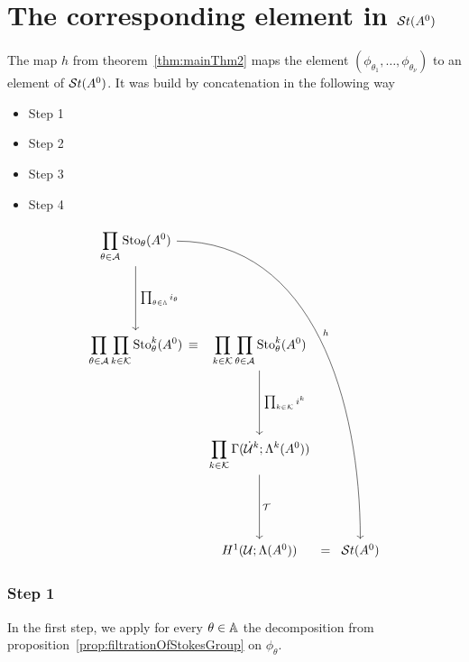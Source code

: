 \section{The corresponding element in $\mathcal{S}{}t(A^0)$}
The map $h$ from theorem~\ref{thm:mainThm2} maps the element
$(\phi_{\theta_1},\dots,\phi_{\theta_\nu})$ to an element of $\mathcal{S}{}t(A^0)$.
It was build by concatenation in the following way
\bgroup
{}
\begin{paracol}{2}\sloppy
\switchcolumn[0]\noindent
  \vspace*{40mm}
  \begin{itemize}
    \item[] Step 1 
    \item[] \qquad Step 2 
    \item[] \qquad \qquad Step 3 
    \item[] \qquad \qquad \qquad Step 4 
  \end{itemize}
\switchcolumn[1]\noindent
  \[ \begin{tikzcd}[column sep=0,row sep=1.8cm]
      \displaystyle \prod_{\theta\in\cA}\Sto_\theta(A^0)
      \dar{\tikzmark{e1}\prod_{\theta\in\A}i_\theta}
      \arrow[dddrrrr, out=0,in=90,"h"]
    \\\displaystyle \prod_{\theta\in\cA}\prod_{k\in\cK}\Sto_\theta^k(A^0)
    &\tikzmark{e2}\!\!\!\!\equiv
    &\displaystyle \prod_{k\in\cK}\prod_{\theta\in\cA}\Sto_\theta^k(A^0)
      \dar{\tikzmark{e3}\prod_{k\in\cK}i^k}
    \\&&\displaystyle \prod_{k\in\cK}\Gamma(\dot\cU^k;\Lambda^k(A^0))
      \dar{\tikzmark{e4}\cT}
    \\&&H^1(\cU;\Lambda(A^0))&=&\St(A^0)
  \end{tikzcd} \]
\end{paracol}
\egroup

\subsubsection{Step 1}
In the first step, we apply for every $\theta\in\mathbb{A}$ the decomposition from 
proposition~\ref{prop:filtrationOfStokesGroup} on $\phi_\theta$.


